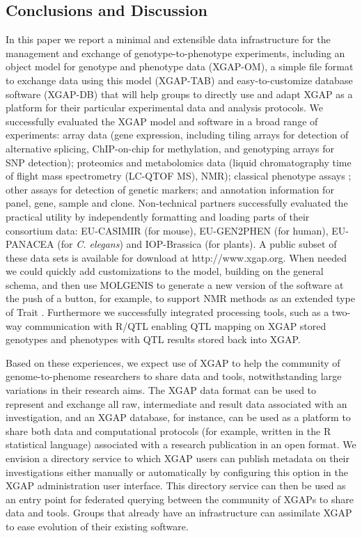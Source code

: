 \subsection{Conclusions and Discussion}
In this paper we report a minimal and extensible data infrastructure for the management and 
exchange of genotype-to-phenotype experiments, including an object model for genotype and 
phenotype data (XGAP-OM), a simple file format to exchange data using this model (XGAP-TAB) 
and easy-to-customize database software (XGAP-DB) that will help groups to directly use and 
adapt XGAP as a platform for their particular experimental data and analysis protocols. We 
successfully evaluated the XGAP model and software in a broad range of experiments: array 
data (gene expression, including tiling arrays for detection of alternative splicing, 
ChIP-on-chip for methylation, and genotyping arrays for SNP detection); proteomics and 
metabolomics data (liquid chromatography time of flight mass spectrometry (LC-QTOF MS), NMR); 
classical phenotype assays \cite{Heap:2009, Bystrykh:2005, Li:2006, Keurentjes:2006, Stranger:2007, Bailey:2008, Beamer:1999}; 
other assays for detection of genetic markers; and annotation information for panel, gene, 
sample and clone. Non-technical partners successfully evaluated the practical utility by 
independently formatting and loading parts of their consortium data: EU-CASIMIR (for mouse), EU-GEN2PHEN (for human), 
EU-PANACEA (for \emph{C. elegans}) and IOP-Brassica (for plants). A public subset of these data sets 
is available for download at http://www.xgap.org. When needed we could quickly add customizations to the 
model, building on the general schema, and then use MOLGENIS to generate a new version of the 
software at the push of a button, for example, to support NMR methods as an extended type of 
Trait \cite{Fu:2009}. Furthermore we successfully integrated processing tools, such as a two-way 
communication with R/QTL \cite{Broman:2003, Arends:2010} enabling QTL mapping on XGAP 
stored genotypes and phenotypes with QTL results stored back into XGAP.

Based on these experiences, we expect use of XGAP to help the community of genome-to-phenome 
researchers to share data and tools, notwithstanding large variations in their research aims. 
The XGAP data format can be used to represent and exchange all raw, intermediate and result 
data associated with an investigation, and an XGAP database, for instance, can be used as a 
platform to share both data and computational protocols (for example, written in the R 
statistical language) associated with a research publication in an open format. We envision 
a directory service to which XGAP users can publish metadata on their investigations either 
manually or automatically by configuring this option in the XGAP administration user interface. 
This directory service can then be used as an entry point for federated querying between the 
community of XGAPs to share data and tools. Groups that already have an infrastructure can 
assimilate XGAP to ease evolution of their existing software.


